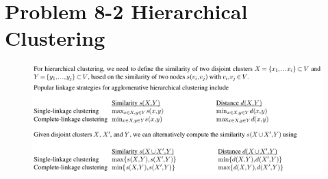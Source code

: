 \section*{Problem 8-2 Hierarchical Clustering}

\begin{figure}[h]
	\centering
	\includegraphics[width=0.9\linewidth]{content/problem2.png}
	\label{distribution}
\end{figure}

